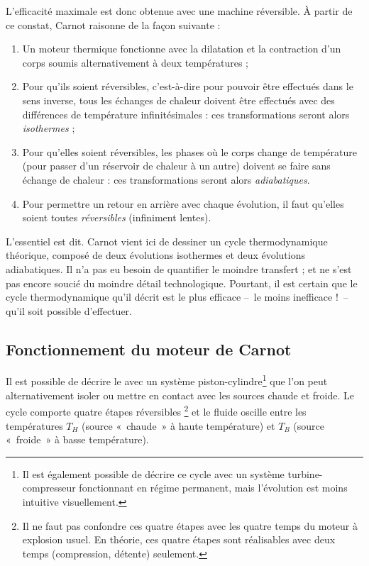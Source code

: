 		L’efficacité maximale est donc obtenue avec une machine réversible. À partir de ce constat, Carnot raisonne de la façon suivante :

		\begin{enumerate}
			\item Un moteur thermique fonctionne avec la dilatation et la contraction d’un corps soumis alternativement à deux températures ;
			\item Pour qu’ils soient réversibles, c’est-à-dire pour pouvoir être effectués dans le sens inverse, tous les échanges de chaleur doivent être effectués avec des différences de température infinitésimales : ces transformations seront alors \emph{isothermes} ;
			\item Pour qu’elles soient réversibles, les phases où le corps change de température (pour passer d’un réservoir de chaleur à un autre) doivent se faire sans échange de chaleur : ces transformations seront alors \emph{adiabatiques}.
			\item Pour permettre un retour en arrière avec chaque évolution, il faut qu’elles soient toutes \emph{réversibles} (infiniment lentes).
		\end{enumerate}

		L’essentiel est dit. Carnot vient ici de dessiner un cycle thermodynamique théorique, composé de deux évolutions isothermes et deux évolutions adiabatiques. Il n’a pas eu besoin de quantifier le moindre transfert ; et ne s’est pas encore soucié du moindre détail technologique. Pourtant, il est certain que le cycle thermodynamique qu’il décrit est le plus efficace --\ le moins inefficace !\ -- qu’il soit possible d’effectuer.

		 

	\subsection{Fonctionnement du moteur de Carnot}
	\label{ch_descritpion_cycle_carnot}

		Il est possible de décrire le  avec un système piston-cylindre\footnote{Il est également possible de décrire ce cycle avec un système turbine-compresseur fonctionnant en régime permanent, mais l’évolution est moins intuitive visuellement.} que l’on peut alternativement isoler ou mettre en contact avec les sources chaude et froide. Le cycle comporte quatre étapes réversibles
		\footnote{Il ne faut pas confondre ces quatre étapes avec les quatre temps du moteur à explosion usuel. En théorie, ces quatre étapes sont réalisables avec deux temps (compression, détente) seulement.} %
		et le fluide oscille entre les températures $T_H$ (source «~chaude~» à haute température) et $T_B$ (source «~froide~» à basse température).

